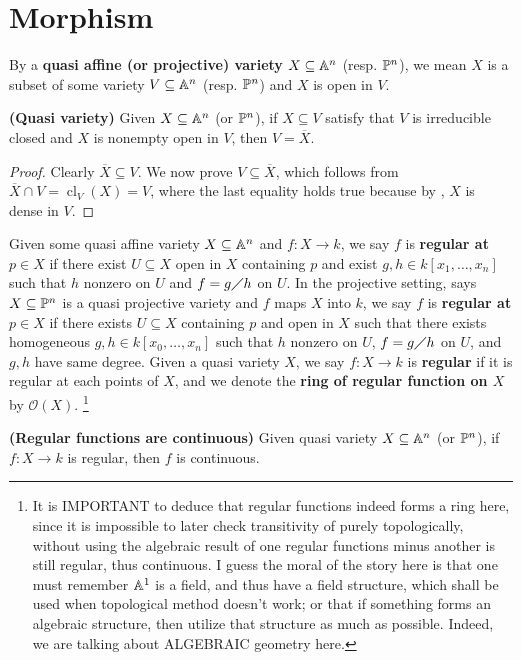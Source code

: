 \documentclass{report}
\begin{document}
\section{Morphism}
By a \textbf{quasi affine (or projective) variety} $X\subseteq \A^n$ (resp. $\P^n$), we mean  $X$ is a subset of some variety $V \subseteq \A^n$ (resp. $\P^n$) and $X$ is open in $V$.
\begin{equiv_def}
\textbf{(Quasi variety)} Given $X\subseteq \A^n$ (or $\P^n$), if $X\subseteq V$ satisfy that $V$ is irreducible closed and  $X$ is nonempty open in  $V$, then  $V=\overline{X}$. 
\end{equiv_def}
\begin{proof}
Clearly $\overline{X}\subseteq V$. We now prove $V \subseteq \overline{X}$, which follows from $\overline{X}\cap V=\operatorname{cl}_V(X)=V$, where the last equality holds true because by , $X$ is dense in  $V$.   
\end{proof}
Given some quasi affine variety $X\subseteq \A^n$ and $f:X \rightarrow  k$, we say $f$ is \textbf{regular at $p \in X$} if there exist $U\subseteq X$ open in $X$ containing $p$ and exist $g,h \in k[x_1,\dots ,x_n]$ such that $h$ nonzero on $U$ and  $f=g\quotient h$ on $U$. In the projective setting, says $X \subseteq \P^n$ is a quasi projective variety and $f$ maps $X$ into  $k$, we say $f$ is \textbf{regular at $p \in X$} if there exists $U \subseteq X$ containing $p$ and open in $X$ such that there exists homogeneous $g,h \in k[x_0,\dots,x_n]$ such that $h$ nonzero on $U$, $f=g\quotient h$ on $U$, and $g,h$ have same degree. Given a quasi variety $X$, we say  $f:X\rightarrow k$ is \textbf{regular} if it is regular at each points of $X$, and we denote the \textbf{ring of regular function on $X$} by $\mathscr{O}(X)$. \label{rorf} 
\footnote{It is IMPORTANT to deduce that regular functions indeed forms a ring here, since it is impossible to later check transitivity of  purely topologically, without using the algebraic result of one regular functions minus another is still regular, thus continuous. I guess the moral of the story here is that one must remember  $\A^1$ is a field, and thus have a field structure, which shall be used when topological method doesn't work; or that if something forms an algebraic structure, then utilize that structure as much as possible.  Indeed, we are talking about ALGEBRAIC geometry here.}
\begin{theorem}
\label{Rfac}
\textbf{(Regular functions are continuous)} Given quasi variety $X\subseteq \A^n$ (or $\P^n$), if $f:X\rightarrow k$ is regular, then $f$ is continuous.  
\end{theorem}
\end{document}
